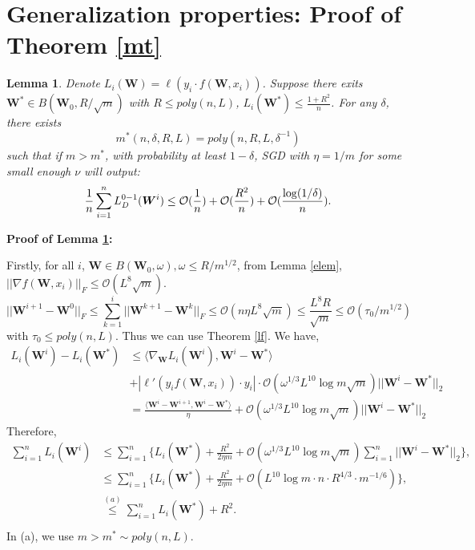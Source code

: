 \documentclass{article}
\newcommand{\cO}{\mathcal{O}}
\newtheorem{lem}[theo]{\textbf{Lemma}}
\begin{document}
\section{Generalization properties: Proof of Theorem \ref{mt}}
\begin{lem}\label{lem1}
Denote $L_i(\bm{W})=\ell(y_i\cdot f(\bm{W},x_i))$. Suppose there exits $\bm{W}^* \in B(\bm{W}_0,R/\sqrt{m})$ with $R\leq poly(n,L)$, $L_i(\bm{W}^*)\leq \frac{1+R^2}{n}$. For any $ \delta$, there exists
\begin{equation}
m^*(n,\delta,R,L)=poly(n,R,L,\delta^{-1})
\end{equation}
such that if $m>m^*$, with probability at least $1-\delta$,  SGD with $\eta=1/m$ for some small enough $\nu$ will output:
\begin{equation}
\frac{1}{n}\sum_{i=1}^n L^{0-1}_{\emph{D}}(\bm{W}^{i})\leq \cO(\frac{1}{ n})+ \cO(\frac{R^2}{ n})+\cO(\frac{\log(1/\delta)}{n}).
\end{equation}
\end{lem}

{\bf Proof of Lemma \ref{lem1}:}

Firstly, for all $i$, $\bm{W}\in B(\bm{W}_0, \omega), \omega\leq R/m^{1/2}$, from Lemma \ref{elem}, $||\nabla f(\bm{W},x_i)||_F\leq \cO(L^{8}\sqrt{m})$.
\begin{equation}
||\bm{W}^{i+1}-\bm{W}^0||_F\leq \sum_{k=1}^i||\bm{W}^{k+1}-\bm{W}^k||_F\leq \cO(n\eta L^{8}\sqrt{m})\leq \frac{L^{8} R}{\sqrt{m}}\leq \cO(\tau_0/m^{1/2})
\end{equation}
with $\tau_0\leq poly(n,L)$.
Thus we can use Theorem \ref{lf}. We have,
\begin{equation}
\begin{aligned}
L_i(\bm{W}^{i})-L_i(\bm{W}^*)&\leq \langle \nabla_{\bm{W}}L_i(\bm{W}^{i}), \bm{W}^{i}-\bm{W}^*\rangle \\
&+ |\ell'(y_if(\bm{W},x_i))\cdot y_i|\cdot \cO(\omega^{1/3}L^{10}\log m\sqrt{m})||\bm{W}^i-\bm{W}^*||_2\\
&=\frac{\langle \bm{W}^i-\bm{W}^{i+1}, \bm{W}^i-\bm{W}^*\rangle}{\eta}  + \cO(\omega^{1/3}L^{10}\log m\sqrt{m})||\bm{W}^i-\bm{W}^*||_2
\end{aligned}
\end{equation}
Therefore,
\begin{equation}
\begin{aligned}
\sum_{i=1}^n L_i(\bm{W}^{i})&\leq \sum_{i=1}^n \{L_i(\bm{W}^*) +\frac{R^2}{2\eta m} + \cO(\omega^{1/3}L^{10}\log m\sqrt{m})\sum_{i=1}^n||\bm{W}^i-\bm{W}^*||_2\},\\
&\leq \sum_{i=1}^n\{L_i(\bm{W}^*) +\frac{R^2}{2\eta m} + \cO(L^{10}\log m\cdot n\cdot R^{4/3}\cdot m^{-1/6})\},\\
&\overset{(a)}{\leq} \sum_{i=1}^nL_i(\bm{W}^*) +  R^2.\\
\end{aligned}
\end{equation}
In (a), we use $m>m^*\sim poly(n,L)$.
\end{document}
